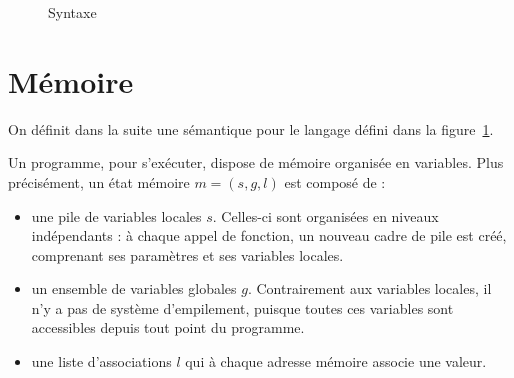 \begin{figure}



  \caption{Syntaxe}
  \label{fig:stx}
\end{figure}

\section{Mémoire}

On définit dans la suite une sémantique pour le langage défini dans la
figure~\ref{fig:stx}.

Un programme, pour s'exécuter, dispose de mémoire organisée en variables. Plus
précisément, un état mémoire $m = (s, g, l)$ est composé de :

\begin{itemize}
\item
  une pile de variables locales $s$. Celles-ci sont organisées en
  niveaux indépendants : à chaque appel de fonction, un nouveau cadre de
  pile est créé, comprenant ses paramètres et ses variables locales.
\item
  un ensemble de variables globales $g$. Contrairement aux variables
  locales, il n'y a pas de système d'empilement, puisque toutes ces
  variables sont accessibles depuis tout point du programme.
\item
  une liste d'associations $l$ qui à chaque adresse mémoire associe une
  valeur.
\end{itemize}


